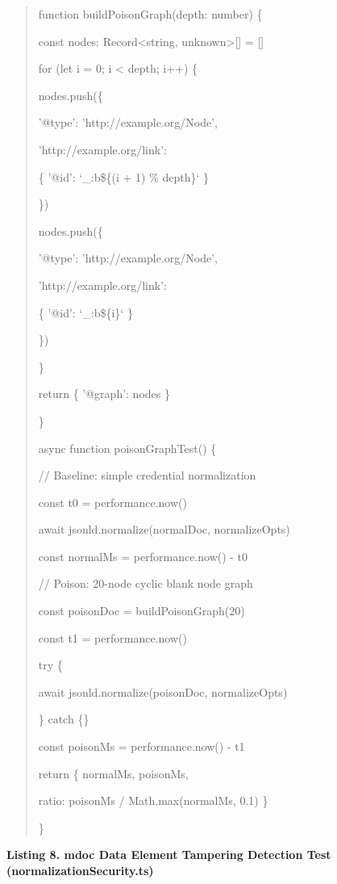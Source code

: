 \begin{quote}
function buildPoisonGraph(depth: number) \{

const nodes: Record\textless string, unknown\textgreater{[}{]} = {[}{]}

for (let i = 0; i \textless{} depth; i++) \{

nodes.push(\{

'@type': 'http://example.org/Node',

'http://example.org/link':

\{ '@id': `\_:b\$\{(i + 1) \% depth\}` \}

\})

nodes.push(\{

'@type': 'http://example.org/Node',

'http://example.org/link':

\{ '@id': `\_:b\$\{i\}` \}

\})

\}

return \{ '@graph': nodes \}

\}

async function poisonGraphTest() \{

// Baseline: simple credential normalization

const t0 = performance.now()

await jsonld.normalize(normalDoc, normalizeOpts)

const normalMs = performance.now() - t0

// Poison: 20-node cyclic blank node graph

const poisonDoc = buildPoisonGraph(20)

const t1 = performance.now()

try \{

await jsonld.normalize(poisonDoc, normalizeOpts)

\} catch \{\}

const poisonMs = performance.now() - t1

return \{ normalMs, poisonMs,

ratio: poisonMs / Math.max(normalMs, 0.1) \}

\}
\end{quote}

\textbf{Listing 8. mdoc Data Element Tampering Detection Test (normalizationSecurity.ts)}

